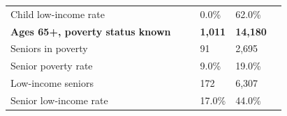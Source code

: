 \documentclass[9pt]{report}
\begin{document}
\begin{tabular}{p{.10in}p{.10in}p{.10in}p{3.7in}>{\hfill}p{.85in}>{\hfill}p{.85in}>{\hfill}p{.85in}>{\hfill}p{.85in}p{0.1in}}
\multicolumn{4}{l}{\parbox{3.6in}{\strut\raggedright{{Child low-income rate}}\strut}} &  &  & 0.0\% & 62.0\% & \multicolumn{1}{l}{}  \\ 
\multicolumn{4}{l}{\parbox{3.5in}{\strut\raggedright{\textbf{Ages 65+, poverty status known}\strut}}} & \textbf{} & \textbf{} & \textbf{1,011} & \textbf{14,180} & \textbf{} \\ 
\multicolumn{4}{l}{\parbox{3.6in}{\strut\raggedright{{Seniors in poverty}}\strut}} &  &  & 91 & 2,695 & \multicolumn{1}{l}{}  \\ 
\multicolumn{4}{l}{\parbox{3.6in}{\strut\raggedright{{Senior poverty rate}}\strut}} &  &  & 9.0\% & 19.0\% & \multicolumn{1}{l}{}  \\ 
\multicolumn{4}{l}{\parbox{3.6in}{\strut\raggedright{{Low-income seniors}}\strut}} &  &  & 172 & 6,307 & \multicolumn{1}{l}{}  \\ 
\multicolumn{4}{l}{\parbox{3.6in}{\strut\raggedright{{Senior low-income rate}}\strut}} &  &  & 17.0\% & 44.0\% & \multicolumn{1}{l}{}  \\ 

\end{tabular}
\setlength{\tabcolsep}{6pt} %
\end{document}
